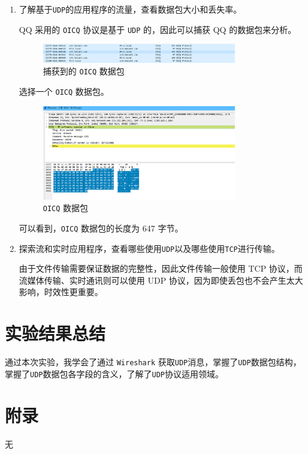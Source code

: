 \documentclass{article}
\begin{document}
\begin{enumerate}[noitemsep]
  \item 了解基于\texttt{UDP}的应用程序的流量，查看数据包大小和丢失率。

        QQ 采用的 \texttt{OICQ} 协议是基于 \texttt{UDP} 的，因此可以捕获 QQ 的数据包来分析。

        \begin{figure}[H]
          \centering
          \includegraphics[width=0.8\textwidth]{img/9.png}
          \caption{捕获到的 \texttt{OICQ} 数据包}
        \end{figure}

        选择一个 \texttt{OICQ} 数据包。

        \begin{figure}[H]
          \centering
          \includegraphics[width=0.8\textwidth]{img/10.png}
          \caption{\texttt{OICQ} 数据包}
        \end{figure}

        可以看到，\texttt{OICQ} 数据包的长度为 647 字节。

  \item 探索流和实时应用程序，查看哪些使用\texttt{UDP}以及哪些使用\texttt{TCP}进行传输。
  
  由于文件传输需要保证数据的完整性，因此文件传输一般使用 TCP 协议，而流媒体传输、实时通讯则可以使用 UDP 协议，因为即使丢包也不会产生太大影响，时效性更重要。

\end{enumerate}

\section{实验结果总结}

通过本次实验，我学会了通过 \texttt{Wireshark} 获取\texttt{UDP}消息，掌握了\texttt{UDP}数据包结构，掌握了\texttt{UDP}数据包各字段的含义，了解了\texttt{UDP}协议适用领域。

\section{附录}

无
\end{document}
